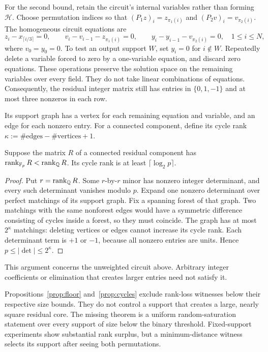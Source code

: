 For the second bound, retain the circuit's internal variables rather than
forming $\mathcal H$. Choose permutation indices so that
$(P_1z)_i=z_{\pi_1(i)}$ and $(P_2v)_i=v_{\pi_2(i)}$. The homogeneous circuit
equations are
\[
 z_i-x_{\lceil i/3\rceil}=0,\qquad
 v_i-v_{i-1}-z_{\pi_1(i)}=0,\qquad
 y_i-y_{i-1}-v_{\pi_2(i)}=0,
 \quad 1\le i\le N,
\]
where $v_0=y_0=0$. To test an output support $W$, set $y_i=0$ for
$i\notin W$. Repeatedly delete a variable forced to zero by a one-variable
equation, and discard zero equations. These operations preserve the
solution space on the remaining variables over every field.
They do not take linear combinations of equations. Consequently, the
residual integer matrix still has entries in $\{0,1,-1\}$ and at most
three nonzeros in each row.

Its support graph has a vertex for each remaining equation and variable,
and an edge for each nonzero entry. For a connected component, define its
cycle rank $\kappa:=\#\text{edges}-\#\text{vertices}+1$.

\begin{proposition}\label{prop:cycles}
Suppose the matrix $R$ of a connected residual component has
$\operatorname{rank}_{\mathbb F_p}R<\operatorname{rank}_{\mathbb Q}R$. Its cycle rank is at least
$\lceil\log_2p\rceil$.
\end{proposition}

\begin{proof}
Put $r=\operatorname{rank}_{\mathbb Q}R$. Some $r$-by-$r$ minor has nonzero integer
determinant, and every such determinant vanishes modulo $p$.
Expand one nonzero determinant over perfect matchings of its support graph.
Fix a spanning forest of that graph. Two matchings with the same nonforest
edges would have a symmetric difference consisting of cycles inside a
forest, so they must coincide. The graph has at most $2^\kappa$ matchings:
deleting vertices or edges cannot increase its cycle rank.
Each determinant term is $+1$ or $-1$, because all nonzero entries are units.
Hence $p\le|\det|\le2^\kappa$.
\end{proof}
This argument concerns the unweighted circuit above. Arbitrary integer
coefficients or elimination that creates larger entries need not satisfy it.

Propositions~\ref{prop:floor} and~\ref{prop:cycles} exclude rank-loss
witnesses below their respective size bounds. They do not control a support that
creates a large, nearly square residual core.  The missing theorem is a
uniform random-saturation statement over every support of size below the
binary threshold.  Fixed-support experiments show substantial rank surplus,
but a minimum-distance witness selects its support after seeing both
permutations.

